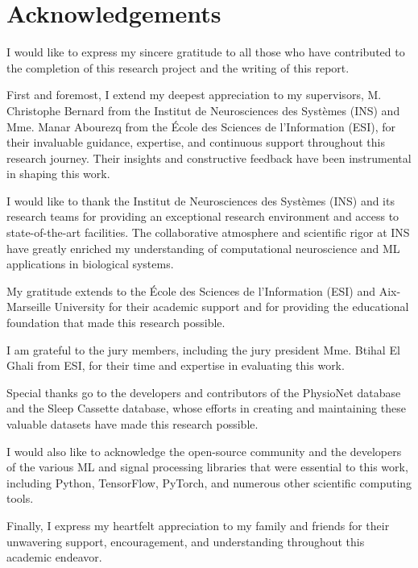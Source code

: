 \documentclass[a4paper,12pt,twoside]{article}
\begin{document}
\section*{Acknowledgements}

\onehalfspacing %

I would like to express my sincere gratitude to all those who have contributed to the completion of this research project and the writing of this report.

First and foremost, I extend my deepest appreciation to my supervisors, M. Christophe Bernard from the Institut de Neurosciences des Systèmes (INS) and Mme. Manar Abourezq from the École des Sciences de l'Information (ESI), for their invaluable guidance, expertise, and continuous support throughout this research journey. Their insights and constructive feedback have been instrumental in shaping this work.

I would like to thank the Institut de Neurosciences des Systèmes (INS) and its research teams for providing an exceptional research environment and access to state-of-the-art facilities. The collaborative atmosphere and scientific rigor at INS have greatly enriched my understanding of computational neuroscience and ML applications in biological systems.

My gratitude extends to the École des Sciences de l'Information (ESI) and Aix-Marseille University for their academic support and for providing the educational foundation that made this research possible.

I am grateful to the jury members, including the jury president Mme. Btihal El Ghali from ESI, for their time and expertise in evaluating this work.

Special thanks go to the developers and contributors of the PhysioNet database and the Sleep Cassette database, whose efforts in creating and maintaining these valuable datasets have made this research possible.

I would also like to acknowledge the open-source community and the developers of the various ML and signal processing libraries that were essential to this work, including Python, TensorFlow, PyTorch, and numerous other scientific computing tools.

Finally, I express my heartfelt appreciation to my family and friends for their unwavering support, encouragement, and understanding throughout this academic endeavor.

\clearpage
\end{document}
